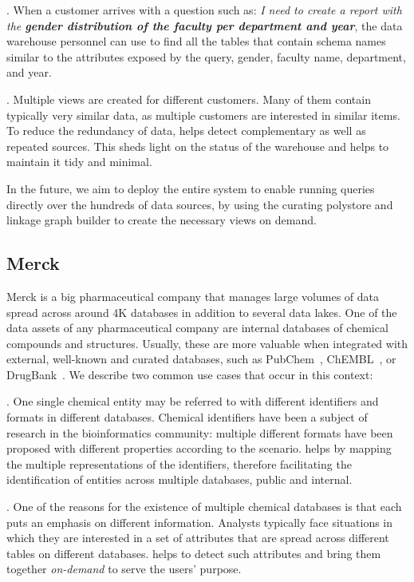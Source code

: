. When a customer arrives with a question such as: \emph{I need to create a report with the \textbf{gender distribution of the faculty per department and year}}, the data warehouse personnel can use \dcv to find all the tables that contain schema names similar to the attributes exposed by the query, \eg gender, faculty name, department, and year.

. Multiple views are created for different customers. Many of them contain typically very similar data, as multiple customers are interested in similar items. To reduce the redundancy of data, \dcv helps  detect complementary as well as repeated sources. This sheds light on the status of the warehouse and helps to maintain it tidy and minimal.

In the future, we aim to deploy the entire \dcv system to enable running queries directly over the hundreds of data sources, by using the curating polystore and linkage graph builder to create the necessary views on demand. 

\subsection{Merck}


Merck is a big pharmaceutical company that manages large volumes of data spread across around 4K databases in addition to several data lakes. 
One of the data assets of any pharmaceutical company are internal databases of chemical compounds and structures. Usually, these are more valuable when integrated with external, well-known and curated databases, such as PubChem~\cite{pubchem}, ChEMBL~\cite{ChEMBL}, or DrugBank~\cite{DrugBank}. We describe two common use cases that occur in this context:


. One single chemical entity may be referred to with different identifiers and formats in different databases. Chemical identifiers have been a subject of research in the bioinformatics community: multiple different formats have been proposed with different properties according to the scenario. \dcv helps by mapping the multiple representations of the identifiers, therefore facilitating the identification of entities across multiple databases, public and internal.



. One of the reasons for the existence of multiple chemical databases is that each puts an emphasis on different information. Analysts typically face situations in which they are interested in a set of attributes that are spread across different tables on different databases. \dcv helps to detect such attributes and bring them together \emph{on-demand}  to serve the users' purpose.

